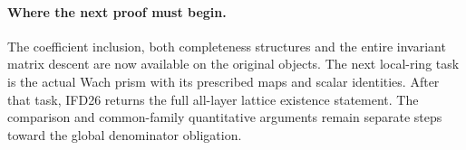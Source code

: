 \paragraph{Where the next proof must begin.}
The coefficient inclusion, both completeness structures and the
entire invariant matrix descent are now available on the original
objects. The next local-ring task is the actual Wach prism with
its prescribed maps and scalar identities. After that task, IFD26
returns the full all-layer lattice existence statement. The
comparison and common-family quantitative arguments remain separate
steps toward the global denominator obligation.
